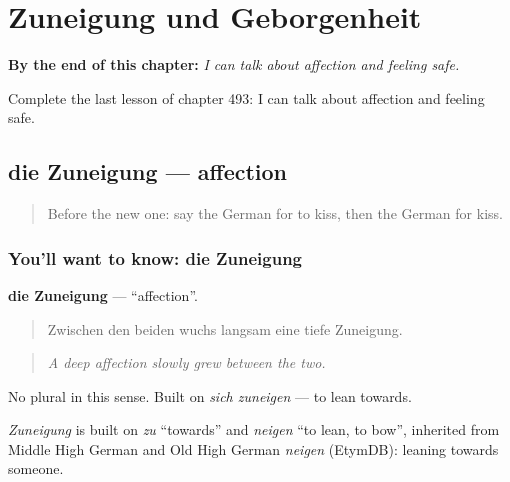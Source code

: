 
\chapter{Zuneigung und Geborgenheit}
\label{ch:ge-zuneigung-und-geborgenheit}

\begin{chapteropening}
\textbf{By the end of this chapter:} \emph{I can talk about affection and feeling safe.}

Complete the last lesson of chapter 493: I can talk about affection and feeling safe.
\end{chapteropening}

\section[die Zuneigung]{die Zuneigung — affection}

\label{lesson:GE-C493-zuneigung}



\begin{quote}
Before the new one: say the German for to kiss, then the German for kiss.
\end{quote}

\subsection*{You'll want to know: die Zuneigung}
\textbf{die Zuneigung} — \textquotedblleft{}affection\textquotedblright{}.

\begin{quote}
Zwischen den beiden wuchs langsam eine tiefe Zuneigung.
\end{quote}

\begin{quote}
\emph{A deep affection slowly grew between the two.}
\end{quote}

No plural in this sense. Built on \emph{sich zuneigen} — to lean towards.

\begin{cousinweb}
\emph{Zuneigung} is built on \emph{zu} \textquotedblleft{}towards\textquotedblright{} and \emph{neigen} \textquotedblleft{}to lean, to bow\textquotedblright{}, inherited from Middle High German and Old High German \emph{neigen} (EtymDB): leaning towards someone.
\end{cousinweb}

